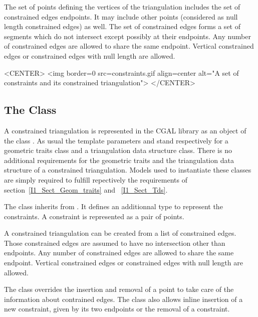 The set of points defining the vertices of the triangulation
includes the set of constrained edges endpoints. It may include other points
(considered as null length constrained edges) as well.  The set of
constrained edges forms a set of segments which do not intersect
except possibly at their endpoints.  Any number of constrained edges
are allowed to share the same endpoint.  Vertical constrained edges or
constrained edges with null length are allowed.


\begin{ccTexOnly}
\begin{center}   \end{center}
\end{ccTexOnly}
 
\begin{ccHtmlOnly}
<CENTER>
<img border=0 src=constraints.gif align=center alt="A set of
constraints and its constrained triangulation">
</CENTER>
\end{ccHtmlOnly}

\subsection{ The Class \protect {}}
A constrained triangulation is represented in the CGAL library as an
object of the class .
As usual the template parameters  and 
stand respectively for a geometric traits class and
a triangulation data structure class. There is no additional
requirements for the geometric traits and the triangulation data
structure of a constrained triangulation.
Models used to instantiate these classes are simply required
to fulfill repectively the requirements 
of section~\ref{I1_Sect_Geom_traits} and ~\ref{I1_Sect_Tds}.

The class 
inherits from .
It defines an additionnal type 
to represent the constraints. A
constraint is represented as a pair of points.

A  constrained triangulation can be created
from a
list of constrained edges. Those constrained edges are assumed to have no
intersection other than endpoints. Any number of constrained edges are
allowed to share the same endpoint.  Vertical constrained edges or
constrained edges with null length are allowed.

The class 
overrides the insertion and removal of a point to take care of the
information about contrained edges. The class also allows inline
insertion of a new constraint, given by its two endpoints
or the removal of a constraint.


